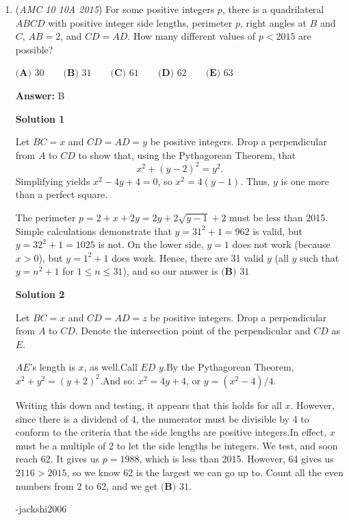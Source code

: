 \begin{enumerate}
 


	\item (\textit{AMC 10 10A 2015}) For some positive integers $p$, there is a quadrilateral $ABCD$ with positive integer side lengths, perimeter $p$, right angles at $B$ and $C$, $AB=2$, and $CD=AD$.  How many different values of $p<2015$ are possible?


 $\textbf{(A) }30\qquad\textbf{(B) }31\qquad\textbf{(C) }61\qquad\textbf{(D) }62\qquad\textbf{(E) }63$

 \textbf{Answer: }B



\textbf{Solution 1}

Let $BC = x$ and $CD = AD = y$ be positive integers. Drop a perpendicular from $A$ to $CD$ to show that, using the Pythagorean Theorem, that
 \[x^2 + (y - 2)^2 = y^2.\]Simplifying yields $x^2 - 4y + 4 = 0$, so $x^2 = 4(y - 1)$. Thus, $y$ is one more than a perfect square.

 The perimeter $p = 2 + x + 2y = 2y + 2\sqrt{y - 1} + 2$ must be less than 2015. Simple calculations demonstrate that $y = 31^2 + 1 = 962$ is valid, but $y = 32^2 + 1 = 1025$ is not. On the lower side, $y = 1$ does not work (because $x > 0$), but $y = 1^2 + 1$ does work. Hence, there are 31 valid $y$ (all $y$ such that $y = n^2 + 1$ for $1 \le n \le 31$), and so our answer is $\boxed{\textbf{(B) } 31}$




\textbf{Solution 2}

Let $BC = x$ and $CD = AD = z$ be positive integers. Drop a perpendicular from $A$ to $CD$. Denote the intersection point of the perpendicular and $CD$ as $E$.

 $AE$'s length is $x$, as well.Call $ED$ $y$.By the Pythagorean Theorem,  $x^2 + y^2 = (y + 2)^2$.And so: $x^2 = 4y + 4$, or $y = (x^2-4)/4$.

 Writing this down and testing, it appears that this holds for all $x$. However, since there is a dividend of 4, the numerator must be divisible by 4 to conform to the criteria that the side lengths are positive integers.In effect, $x$ must be a multiple of 2 to let the side lengths be integers. We test, and soon reach 62. It gives us $p = 1988$, which is less than 2015. However, 64 gives us $2116 > 2015$, so we know 62 is the largest we can go up to. Count all the even numbers from 2 to 62, and we get $\boxed{\textbf{(B) } 31}$.

 -jackshi2006

 




\end{enumerate}
